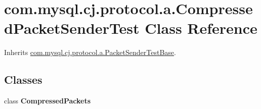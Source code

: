\hypertarget{classcom_1_1mysql_1_1cj_1_1protocol_1_1a_1_1_compressed_packet_sender_test}{}\section{com.\+mysql.\+cj.\+protocol.\+a.\+Compressed\+Packet\+Sender\+Test Class Reference}
\label{classcom_1_1mysql_1_1cj_1_1protocol_1_1a_1_1_compressed_packet_sender_test}


Inherits \mbox{\hyperlink{classcom_1_1mysql_1_1cj_1_1protocol_1_1a_1_1_packet_sender_test_base}{com.\+mysql.\+cj.\+protocol.\+a.\+Packet\+Sender\+Test\+Base}}.

\subsection*{Classes}
\begin{DoxyCompactItemize}
\item 
class {\bfseries Compressed\+Packets}
\end{DoxyCompactItemize}
